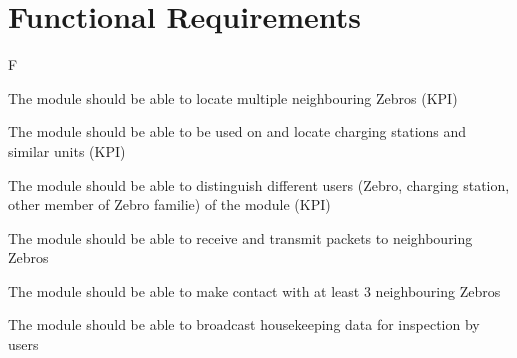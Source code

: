 \section{Functional Requirements}
\begin{reqs}{F}
  \item\label{req:neighbours} The module should be able to locate multiple neighbouring Zebros (KPI)
    \begin{subreqs}
      \item\label{req:allunits} The module should be able to be used on and locate charging stations and similar units (KPI)
      \item\label{req:distinguish} The module should be able to distinguish different users (Zebro, charging station, other member of Zebro familie) of the module (KPI)
    \end{subreqs}

  \item The module should be able to receive and transmit packets to neighbouring Zebros
    \begin{subreqs}
      \item The module should be able to make contact with at least 3 neighbouring Zebros
      \item The module should be able to broadcast housekeeping data for inspection by users
    \end{subreqs}
\end{reqs}


